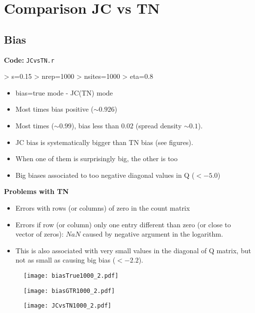 \documentclass[12pt,letterpaper]{article}
\begin{document}
\section{Comparison JC vs TN}
\subsection{Bias}
\textbf{Code:} \texttt{JCvsTN.r}

\begin{Schunk}
\begin{Sinput}
> s=0.15
> nrep=1000
> nsites=1000
> eta=0.8
\end{Sinput}
\end{Schunk}


\begin{itemize}
\item bias=true mode - JC(TN) mode
\item Most times bias positive ($\sim 0.926$)
\item Most times ($\sim 0.99$), bias less than $0.02$ (spread density $\sim 0.1$).
\item JC bias is systematically bigger than TN bias (see figures).
\item When one of them is surprisingly big, the other is too
\item Big biases associated to too negative diagonal values in Q ($<-5.0$)
\end{itemize}

\textbf{Problems with TN}
\begin{itemize}
\item Errors with rows (or columns) of zero in the count matrix
\item Errors if row (or column) only one entry different than zero (or
  close to vector of zeros): $NaN$ caused by negative argument in the logarithm.
\item This is also associated with very small values in the diagonal
  of Q matrix, but not as small as causing big bias ($<-2.2$).
\end{itemize}

\begin{figure}
\centering
\texttt{[image: biasTrue1000\_2.pdf]}
\end{figure}

\begin{figure}
\centering
\texttt{[image: biasGTR1000\_2.pdf]}
\end{figure}

\begin{figure}
\centering
\texttt{[image: JCvsTN1000\_2.pdf]}
\end{figure}
\end{document}
